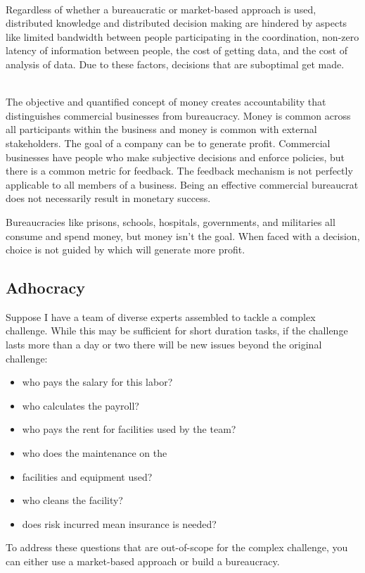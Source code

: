 \ \\

Regardless of whether a bureaucratic or market-based approach is used, 
distributed knowledge and distributed decision making are hindered by aspects like
limited bandwidth between people participating in the coordination,
non-zero latency of information between people,
the cost of getting data,
and
the cost of analysis of data.
Due to these factors, decisions that are suboptimal get made. 

\ \\

The objective and quantified concept of money creates accountability that distinguishes commercial businesses from bureaucracy. Money is common across all participants within the business and money is common with external stakeholders. The goal of a company can be to generate profit. Commercial businesses have people who make subjective decisions and enforce policies, but there is a common metric for feedback. The feedback mechanism is not perfectly applicable to all members of a business. Being an effective commercial bureaucrat does not necessarily result in monetary success.

Bureaucracies like prisons, schools, hospitals, governments, and militaries all consume and spend money, but money isn't the goal. When faced with a decision, choice is not guided by which will generate more profit. \cite{2012_Wilson}

\subsection{Adhocracy}

Suppose I have a team of diverse experts assembled to tackle a complex challenge.
While this may be sufficient for short duration tasks, if the challenge lasts more than a day or two there will be new issues beyond the original challenge:

\begin{itemize}
    \item who pays the salary for this labor?
    \item who calculates the payroll?
    \item who pays the rent for facilities used by the team?
    \item who does the maintenance on the     \item facilities and equipment used?
    \item who cleans the facility?
    \item does risk incurred mean insurance is needed?
\end{itemize}
To address these questions that are out-of-scope for the complex challenge, you can either use a market-based approach or build a bureaucracy. 




